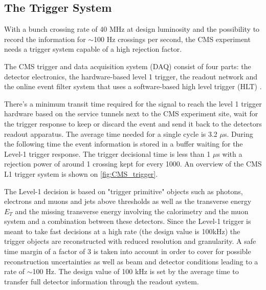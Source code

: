 \clearpage

\subsection{The Trigger System}

With a bunch crossing rate of 40 MHz at design luminosity and the possibility to record the information for $\sim$100 Hz crossings per second, the CMS experiment needs a trigger system capable of a high rejection factor.

The CMS trigger and data acquisition system (DAQ) consist of four parts: the detector electronics, the hardware-based level 1 trigger, the readout network and the online event filter system that uses a software-based high level trigger (HLT) \cite{bib:cmstdr:trigger}.

There's a minimum transit time required for the signal to reach the level 1 trigger hardware based on the service tunnels next to the CMS experiment site, wait for the trigger response to keep or discard the event and send it back to the detectors readout apparatus. The average time needed for a single cycle is 3.2 $\mu$s. During the following time the event information is stored in a buffer waiting for the Level-1 trigger response. The trigger decisional time is less than 1 $\mu$s with a rejection power of around 1 crossing kept for every 1000. An overview of the CMS L1 trigger system is shown on \autoref{fig:CMS_trigger}.

The Level-1 decision is based on "trigger primitive" objects such as photons, electrons and muons and jets above thresholds as well as the transverse energy $E_{T}$ and the missing transverse energy \met involving the calorimetry and the muon system and a combination between these detectors. Since the Level-1 trigger is meant to take fast decisions at a high rate (the design value is 100kHz) the trigger objects are reconstructed with reduced resolution and granularity. A safe time margin of a factor of 3 is taken into account in order to cover for possible reconstruction uncertainties as well as beam and detector conditions leading to a rate of $\sim$100 Hz. The design value of 100 kHz is set by the average time to transfer full detector information through the readout system.

